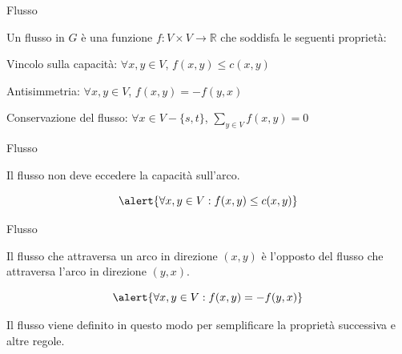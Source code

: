 \begin{frame}{Flusso}

\vspace{-9pt}
\begin{myboxtitle}[Flusso]
Un \alert{flusso} in $G$ è una funzione \alert{$f: V \times V \rightarrow \mathbb{R}$} 
che soddisfa le seguenti proprietà:
\BIL
\item \alert{Vincolo sulla capacità}: $\forall x,y \in V$, $f(x,y) \leq c(x,y)$

\item \alert{Antisimmetria}: $\forall x,y \in V$, $f(x,y) = -f(y,x)$

\item \alert{Conservazione del flusso}: $\forall x \in V-\{s,t\}$, 
$\sum_{y \in V} f(x,y) = 0$
\EIL
\end{myboxtitle}

\end{frame}

\begin{frame}{Flusso}

\vspace{-9pt}
\begin{myboxtitle}
Il flusso non deve eccedere la capacità sull'arco.

\[
\alert{\forall x,y \in V: f(x,y) \leq c(x,y)}
\]
\end{myboxtitle}

\smallskip
\begin{center}
\end{center}

\end{frame}


\begin{frame}{Flusso}

\vspace{-9pt}
\begin{myboxtitle}
Il flusso che attraversa un arco in direzione $(x,y)$ è l'opposto del flusso che attraversa l'arco in direzione $(y,x)$.

\[
\alert{\forall x,y \in V: f(x,y) = -f(y,x)}
\]

Il flusso viene definito in questo modo per semplificare la proprietà successiva e altre regole.
\end{myboxtitle}

\smallskip
\begin{center}
\end{center}

\end{frame}

